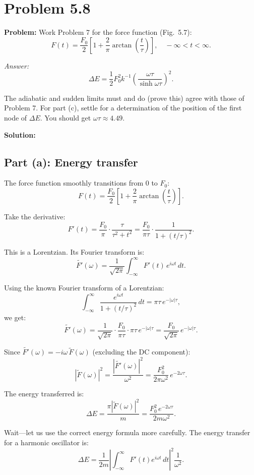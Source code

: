 \documentclass[12pt]{article}
\begin{document}
\section*{Problem 5.8}

\textbf{Problem:} Work Problem 7 for the force function (Fig.\ 5.7):
\[
F(t) = \frac{F_0}{2}\left[1 + \frac{2}{\pi}\arctan\left(\frac{t}{\tau}\right)\right], \quad -\infty < t < \infty.
\]

\emph{Answer:}
\[
\Delta E = \frac{1}{2}F_0^2 k^{-1}\left(\frac{\omega\tau}{\sinh\omega\tau}\right)^2.
\]

The adiabatic and sudden limits must and do (prove this) agree with those of Problem 7. For part (c), settle for a determination of the position of the first node of $\Delta E$. You should get $\omega\tau \approx 4.49$.

\bigskip
\textbf{Solution:}

\subsection*{Part (a): Energy transfer}

The force function smoothly transitions from $0$ to $F_0$:
\[
F(t) = \frac{F_0}{2}\left[1 + \frac{2}{\pi}\arctan\left(\frac{t}{\tau}\right)\right].
\]

Take the derivative:
\[
F'(t) = \frac{F_0}{\pi}\cdot\frac{\tau}{\tau^2 + t^2} = \frac{F_0}{\pi\tau}\cdot\frac{1}{1+(t/\tau)^2}.
\]

This is a Lorentzian. Its Fourier transform is:
\[
\widetilde{F'}(\omega) = \frac{1}{\sqrt{2\pi}}\int_{-\infty}^{\infty} F'(t)\,e^{i\omega t}\,dt.
\]

Using the known Fourier transform of a Lorentzian:
\[
\int_{-\infty}^{\infty}\frac{e^{i\omega t}}{1+(t/\tau)^2}\,dt = \pi\tau\,e^{-|\omega|\tau},
\]
we get:
\[
\widetilde{F'}(\omega) = \frac{1}{\sqrt{2\pi}}\cdot\frac{F_0}{\pi\tau}\cdot\pi\tau\,e^{-|\omega|\tau} = \frac{F_0}{\sqrt{2\pi}}\,e^{-|\omega|\tau}.
\]

Since $\widetilde{F'}(\omega) = -i\omega\,\tilde{F}(\omega)$ (excluding the DC component):
\[
|\tilde{F}(\omega)|^2 = \frac{|\widetilde{F'}(\omega)|^2}{\omega^2} = \frac{F_0^2}{2\pi\omega^2}\,e^{-2\omega\tau}.
\]

The energy transferred is:
\[
\Delta E = \frac{\pi|\tilde{F}(\omega)|^2}{m} = \frac{F_0^2\,e^{-2\omega\tau}}{2m\omega^2}.
\]

Wait---let us use the correct energy formula more carefully. The energy transfer for a harmonic oscillator is:
\[
\Delta E = \frac{1}{2m}\left|\int_{-\infty}^{\infty}F'(t)e^{i\omega t}\,dt\right|^2\frac{1}{\omega^2}.
\]
\end{document}
